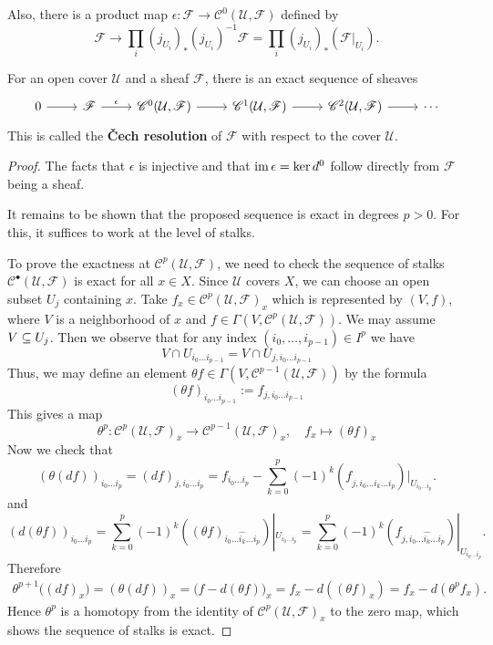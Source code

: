 Also, there is a product map $\epsilon:\mathscr{F}\to\mathscr{C}^0(\mathcal{U},\mathscr{F})$ defined by
\[\mathscr{F}\to\prod_i(j_{U_i})_*(j_{U_i})^{-1}\mathscr{F}=\prod_i(j_{U_i})_*(\mathscr{F}|_{U_i}).\]
\begin{proposition}\label{Cech resolution}
For an open cover $\mathcal{U}$ and a sheaf $\mathscr{F}$, there is an exact sequence of sheaves
\[\begin{tikzcd}
0\ar[r]&\mathscr{F}\ar[r,"\epsilon"]&\mathscr{C}^0(\mathcal{U},\mathscr{F})\ar[r]&\mathscr{C}^1(\mathcal{U},\mathscr{F})\ar[r]&\mathscr{C}^2(\mathcal{U},\mathscr{F})\ar[r]&\cdots
\end{tikzcd}\]
This is called the \textbf{\v{C}ech resolution} of $\mathscr{F}$ with respect to the cover $\mathcal{U}$.
\end{proposition}
\begin{proof}
The facts that $\epsilon$ is injective and that $\operatorname{im}\epsilon=\operatorname{ker} d^0$ follow directly from $\mathscr{F}$ being a sheaf.\par
It remains to be shown that the proposed sequence is exact in degrees $p>0$. For this, it suffices to work at the level of stalks.\par
To prove the exactness at $\mathscr{C}^p(\mathcal{U},\mathscr{F})$, we need to check the sequence of stalks $\mathscr{C}^\bullet(\mathcal{U},\mathscr{F})$ is exact for all $x\in X$. Since $\mathcal{U}$ covers $X$, we can choose an open subset $U_j$ containing $x$. Take $f_x\in\mathscr{C}^p(\mathcal{U},\mathscr{F})_x$ which is represented by $(V,f)$, where $V$ is a neighborhood of $x$ and $f\in\Gamma(V,\mathscr{C}^p(\mathcal{U},\mathscr{F}))$. We may assume $V\subseteq U_j$. Then we observe that for any index $(i_0,\dots,i_{p-1})\in I^p$ we have
\[V\cap U_{i_0\dots i_{p-1}}=V\cap U_{j,i_0\dots i_{p-1}}\]
Thus, we may define an element $\theta f\in\Gamma(V,\mathscr{C}^{p-1}(\mathcal{U},\mathscr{F}))$ by the formula
\[(\theta f)_{i_0\dots i_{p-1}}:=f_{j,i_0\dots i_{p-1}}\]
This gives a map \[\theta^p:\mathscr{C}^p(\mathcal{U},\mathscr{F})_x\to\mathscr{C}^{p-1}(\mathcal{U},\mathscr{F})_x,\quad f_x\mapsto (\theta f)_x\]
Now we check that
\[(\theta(df))_{i_0\dots i_p}=(df)_{j,i_0\dots i_p}=f_{i_0\dots i_p}-\sum_{k=0}^{p}(-1)^k(f_{j,i_0\dots\widehat{i_k}\dots i_p})|_{U_{i_0\dots i_p}}.\]
and
\[(d(\theta f))_{i_0\dots i_p}=\sum_{k=0}^{p}(-1)^k((\theta f)_{i_0\dots\widehat{i_k}\dots i_p})|_{U_{i_0\dots i_p}}=\sum_{k=0}^{p}(-1)^k(f_{j,i_0\dots\widehat{i_k}\dots i_p})|_{U_{i_0\dots i_p}}.\]
Therefore
\begin{align*}
\theta^{p+1}\big((df)_x\big)=(\theta(df))_x=\big(f-d(\theta f)\big)_x=f_x-d((\theta f)_x)=f_x-d(\theta^pf_x).
\end{align*}
Hence $\theta^p$ is a homotopy from the identity of $\mathscr{C}^p(\mathcal{U},\mathscr{F})_x$ to the zero map, which shows the sequence of stalks is exact.
\end{proof}
